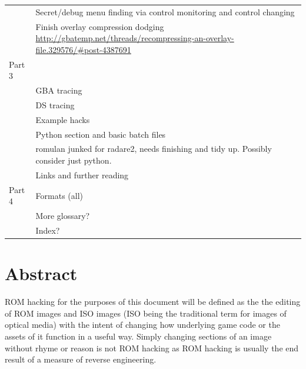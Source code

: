 \documentclass[
]{book}
\begin{document}
\begin{longtable}[]{@{}
  >{\raggedright\arraybackslash}p{}
  >{\raggedright\arraybackslash}p{}@{}}
& Secret/debug menu finding via control monitoring and control changing \\
& Finish overlay compression dodging \url{http://gbatemp.net/threads/recompressing-an-overlay-file.329576/\#post-4387691} \\
Part 3 & \\
& GBA tracing \\
& DS tracing \\
& Example hacks \\
& Python section and basic batch files \\
& romulan junked for radare2, needs finishing and tidy up. Possibly consider just python. \\
& Links and further reading \\
Part 4 & Formats (all) \\
& More glossary? \\
& Index? \\
\bottomrule()
\end{longtable}

\hypertarget{abstract}{%
\chapter*{Abstract}\label{abstract}}

ROM hacking for the purposes of this document will be defined as the the editing of ROM images and ISO images (ISO being the traditional term for images of optical media) with the intent of changing how underlying game code or the assets of it function in a useful way. Simply changing sections of an image without rhyme or reason is not ROM hacking as ROM hacking is usually the end result of a measure of reverse engineering.
\end{document}
